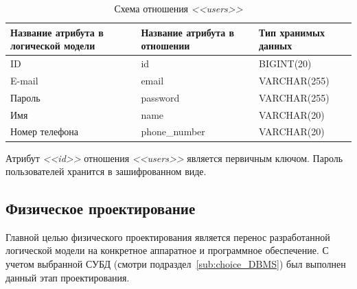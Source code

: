 \begin{table}[h]
  \caption{Схема отношения \textit{<<users>>}}
  \label{tbl:users_scheme}
  \small{
    \centering
    \begin{tabular}{| p{} | p{} | p{} |}
      \hline
      Название атрибута в \newline логической модели &
      Название атрибута в \newline отношении &
      Тип хранимых данных \\

      \hline
      ID & id & BIGINT(20) \\

      \hline
      E-mail & email & VARCHAR(255) \\

      \hline
      Пароль & password & VARCHAR(255) \\

      \hline
      Имя & name & VARCHAR(20) \\

      \hline
      Номер телефона & phone\_number & VARCHAR(20) \\

      \hline
    \end{tabular}
    }
\end{table}

Атрибут \textit{<<id>>} отношения \textit{<<users>>} является первичным ключом.
Пароль пользователей хранится в зашифрованном виде.

\subsection{Физическое проектирование}
\label{sub:db_structure_physical_design}

Главной целью физического проектирования является перенос разработанной логической модели
на конкретное аппаратное и программное обеспечение. С учетом выбранной СУБД (смотри
подраздел~\ref{sub:choice_DBMS}) был выполнен данный этап проектирования.

\pagebreak
